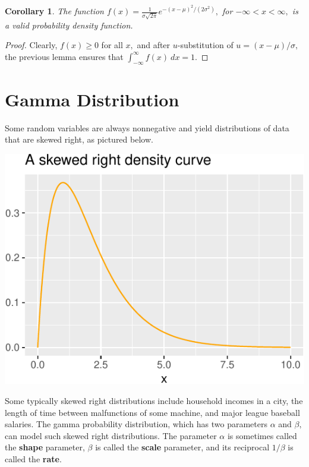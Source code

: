 \documentclass[
]{book}
\newtheorem{corollary}{Corollary}[chapter]
\theoremstyle{definition}
\theoremstyle{definition}
\theoremstyle{definition}
\theoremstyle{definition}
\theoremstyle{remark}
\begin{document}
\begin{corollary}
The function \(f(x) = \frac{1}{\sigma\sqrt{2\pi}}e^{-(x-\mu)^2/(2\sigma^2)},\) for \(-\infty < x <  \infty,\) is a valid probability density function.
\end{corollary}

\begin{proof}
Clearly, \(f(x) \geq 0\) for all \(x,\) and after \(u\)-substitution of \(u = (x-\mu)/\sigma,\) the previous lemma ensures that \(\int_{-\infty}^\infty f(x)~dx = 1\).
\end{proof}

\section{Gamma Distribution}\label{gamma-distribution}

Some random variables are always nonnegative and yield distributions of data that are skewed right, as pictured below.

\includegraphics{math340-notes_files/figure-latex/unnamed-chunk-20-1.pdf}

Some typically skewed right distributions include household incomes in a city, the length of time between malfunctions of some machine, and major league baseball salaries. The gamma probability distribution, which has two parameters \(\alpha\) and \(\beta,\) can model such skewed right distributions. The parameter \(\alpha\) is sometimes called the \textbf{shape} parameter, \(\beta\) is called the \textbf{scale} parameter, and its reciprocal \(1/\beta\) is called the \textbf{rate}.
\end{document}
